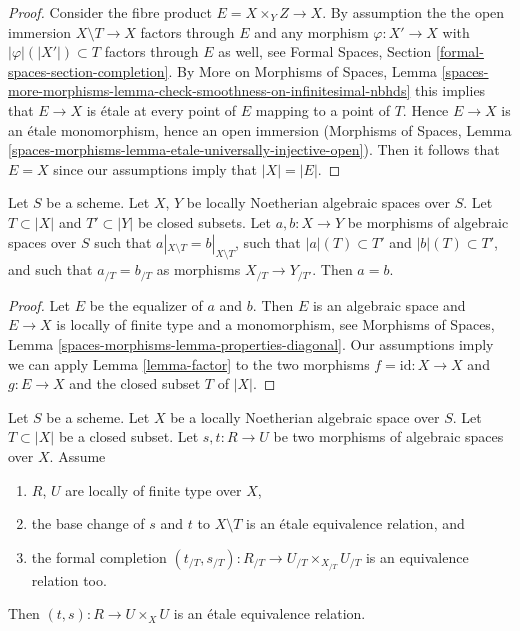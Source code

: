 \begin{proof}
Consider the fibre product $E = X \times_Y Z \to X$.
By assumption the the open immersion $X \setminus T \to X$
factors through $E$ and any morphism $\varphi : X' \to X$ with
$|\varphi|(|X'|) \subset T$ factors through $E$ as well, see
Formal Spaces, Section \ref{formal-spaces-section-completion}.
By More on Morphisms of Spaces, Lemma
\ref{spaces-more-morphisms-lemma-check-smoothness-on-infinitesimal-nbhds}
this implies that $E \to X$ is \'etale at every point of $E$
mapping to a point of $T$. Hence $E \to X$ is an \'etale
monomorphism, hence an open immersion
(Morphisms of Spaces, Lemma
\ref{spaces-morphisms-lemma-etale-universally-injective-open}).
Then it follows that $E = X$ since our assumptions imply that $|X| = |E|$.
\end{proof}

\begin{lemma}
\label{lemma-faithful}
Let $S$ be a scheme. Let $X$, $Y$ be locally Noetherian algebraic spaces
over $S$. Let $T \subset |X|$ and $T' \subset |Y|$ be closed subsets.
Let $a, b : X \to Y$ be morphisms of algebraic spaces over $S$ such
that $a|_{X \setminus T} = b|_{X \setminus T}$, such that
$|a|(T) \subset T'$ and $|b|(T) \subset T'$, and such that
$a_{/T} = b_{/T}$ as morphisms $X_{/T} \to Y_{/T'}$.
Then $a = b$.
\end{lemma}

\begin{proof}
Let $E$ be the equalizer of $a$ and $b$. Then $E$ is an algebraic space
and $E \to X$ is locally of finite type and a monomorphism, see
Morphisms of Spaces, Lemma \ref{spaces-morphisms-lemma-properties-diagonal}.
Our assumptions imply we can apply Lemma \ref{lemma-factor} to the two
morphisms $f = \text{id} : X \to X$ and $g : E \to X$ and the closed
subset $T$ of $|X|$.
\end{proof}

\begin{lemma}
\label{lemma-equivalence-relation}
Let $S$ be a scheme. Let $X$ be a locally Noetherian algebraic space
over $S$. Let $T \subset |X|$ be a closed subset.
Let $s, t : R \to U$ be two morphisms of algebraic spaces over $X$.
Assume
\begin{enumerate}
\item $R$, $U$ are locally of finite type over $X$,
\item the base change of $s$ and $t$ to $X \setminus T$
is an \'etale equivalence relation, and
\item the formal completion
$(t_{/T}, s_{/T}) : R_{/T} \to U_{/T} \times_{X_{/T}} U_{/T}$
is an equivalence relation too.
\end{enumerate}
Then $(t, s) : R \to U \times_X U$ is an \'etale equivalence relation.
\end{lemma}

